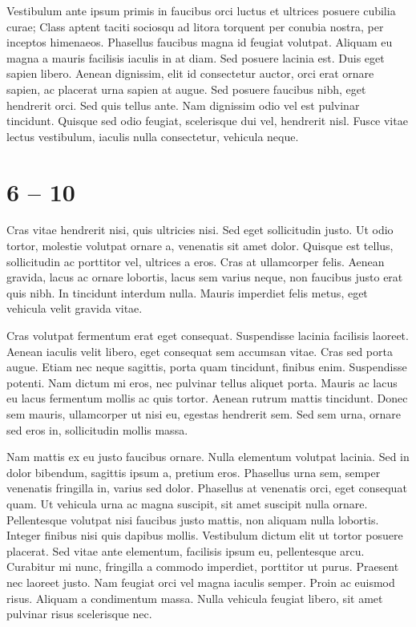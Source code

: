 \documentclass[12pt, a4paper]{article}
\begin{document}
Vestibulum ante ipsum primis in faucibus orci luctus et ultrices posuere cubilia curae; Class aptent taciti sociosqu ad litora torquent per conubia nostra, per inceptos himenaeos. Phasellus faucibus magna id feugiat volutpat. Aliquam eu magna a mauris facilisis iaculis in at diam. Sed posuere lacinia est. Duis eget sapien libero. Aenean dignissim, elit id consectetur auctor, orci erat ornare sapien, ac placerat urna sapien at augue. Sed posuere faucibus nibh, eget hendrerit orci. Sed quis tellus ante. Nam dignissim odio vel est pulvinar tincidunt. Quisque sed odio feugiat, scelerisque dui vel, hendrerit nisl. Fusce vitae lectus vestibulum, iaculis nulla consectetur, vehicula neque.

\section{6 -- 10}

Cras vitae hendrerit nisi, quis ultricies nisi. Sed eget sollicitudin justo. Ut odio tortor, molestie volutpat ornare a, venenatis sit amet dolor. Quisque est tellus, sollicitudin ac porttitor vel, ultrices a eros. Cras at ullamcorper felis. Aenean gravida, lacus ac ornare lobortis, lacus sem varius neque, non faucibus justo erat quis nibh. In tincidunt interdum nulla. Mauris imperdiet felis metus, eget vehicula velit gravida vitae.

Cras volutpat fermentum erat eget consequat. Suspendisse lacinia facilisis laoreet. Aenean iaculis velit libero, eget consequat sem accumsan vitae. Cras sed porta augue. Etiam nec neque sagittis, porta quam tincidunt, finibus enim. Suspendisse potenti. Nam dictum mi eros, nec pulvinar tellus aliquet porta. Mauris ac lacus eu lacus fermentum mollis ac quis tortor. Aenean rutrum mattis tincidunt. Donec sem mauris, ullamcorper ut nisi eu, egestas hendrerit sem. Sed sem urna, ornare sed eros in, sollicitudin mollis massa.

Nam mattis ex eu justo faucibus ornare. Nulla elementum volutpat lacinia. Sed in dolor bibendum, sagittis ipsum a, pretium eros. Phasellus urna sem, semper venenatis fringilla in, varius sed dolor. Phasellus at venenatis orci, eget consequat quam. Ut vehicula urna ac magna suscipit, sit amet suscipit nulla ornare. Pellentesque volutpat nisi faucibus justo mattis, non aliquam nulla lobortis. Integer finibus nisi quis dapibus mollis. Vestibulum dictum elit ut tortor posuere placerat. Sed vitae ante elementum, facilisis ipsum eu, pellentesque arcu. Curabitur mi nunc, fringilla a commodo imperdiet, porttitor ut purus. Praesent nec laoreet justo. Nam feugiat orci vel magna iaculis semper. Proin ac euismod risus. Aliquam a condimentum massa. Nulla vehicula feugiat libero, sit amet pulvinar risus scelerisque nec.
\end{document}
